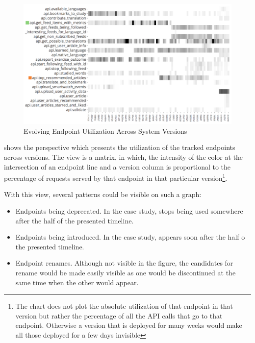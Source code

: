     \begin{figure}[h!]
      \centering
      \includegraphics[width=\linewidth]{utilization-evolution}
      \caption{Evolving Endpoint Utilization Across System Versions}
      \label{fig:mv-util}
    \end{figure}

   shows the  perspective which presents the utilization of the tracked endpoints across versions. The view is a matrix, in which, the intensity of the color at the intersection of an endpoint line and a version column is proportional to the percentage of requests served by that endpoint in that particular version\footnote{The chart does not plot the absolute utilization of that endpoint in that version but rather the percentage of all the API calls that go to that endpoint. Otherwise a version that is deployed for many weeks would make all those deployed for a few days invisible}.

  With this view, several patterns could be visible on such a graph:
  \begin{itemize}
    
    \item Endpoints being deprecated. In the case study, \epFeedItems stops being used somewhere after the half of the presented timeline.

    \item Endpoints being introduced. In the case study, \epTopArticles appears soon after the half o the presented timeline. 

    \item Endpoint renames. Although not visible in the figure, the candidates for rename would be made easily visible as one would be discontinued at the same time when the other would appear. 

  \end{itemize}


